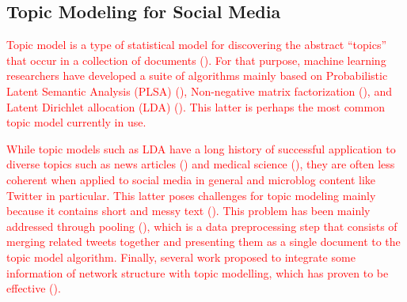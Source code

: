 \subsection*{Topic Modeling for Social Media} 

\textcolor{red}{
Topic model is a type of statistical model for discovering the abstract ``topics'' that occur in a collection of documents (\cite{Blei2012}). For that purpose, machine learning researchers have developed a suite of algorithms mainly based on Probabilistic Latent Semantic Analysis (PLSA) (\cite{Hofmann1999}), 
Non-negative matrix factorization (\cite{Lee1999,Arora2012,luo2017probabilistic}), and Latent Dirichlet allocation (LDA) (\cite{blei2003latent}). This latter is perhaps the most common topic model currently in use. 
}

\textcolor{red}{
While topic models such as LDA have a long history of successful application to diverse topics such as news articles (\cite{chen2010opinion,cohen2013classifying,Greene2015})  and medical science (\cite{paul2011you,wu2012ranking,zhang2017idoctor}), they are often less coherent when applied to social media in general and microblog content  like Twitter in particular. This latter poses challenges for topic modeling mainly because it contains short and messy text (\cite{Zhao2011,Han2012,sanner:sigir13,Jelodar2018}).
This problem has been mainly addressed through pooling (\cite{Hong2010,Weng2010,Naveed2011,sanner:sigir13,alvarez2016topic}), which is a data preprocessing step that consists of merging related tweets together and presenting them as a single document to the topic model algorithm.
Finally, several work proposed to integrate some information of network structure with topic modelling, which has proven to be effective  (\cite{Tang2008,Chen2012,Kim2012,Chen2017}).
}




